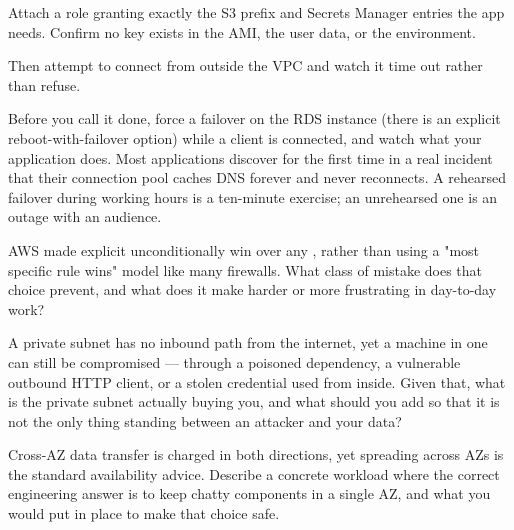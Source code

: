 Attach a role granting exactly the S3 prefix and Secrets Manager entries the app needs. Confirm no key exists in the AMI, the user data, or the environment.

Then attempt to connect from outside the VPC and watch it time out rather than refuse.

\begin{prodtip}
Before you call it done, force a failover on the RDS instance (there is an explicit reboot-with-failover option) while a client is connected, and watch what your application does. Most applications discover for the first time in a real incident that their connection pool caches DNS forever and never reconnects. A rehearsed failover during working hours is a ten-minute exercise; an unrehearsed one is an outage with an audience.
\end{prodtip}


\begin{thinkbox}
AWS made explicit  unconditionally win over any , rather than using a "most specific rule wins" model like many firewalls. What class of mistake does that choice prevent, and what does it make harder or more frustrating in day-to-day work?
\end{thinkbox}

\begin{thinkbox}
A private subnet has no inbound path from the internet, yet a machine in one can still be compromised --- through a poisoned dependency, a vulnerable outbound HTTP client, or a stolen credential used from inside. Given that, what is the private subnet actually buying you, and what should you add so that it is not the only thing standing between an attacker and your data?
\end{thinkbox}

\begin{thinkbox}
Cross-AZ data transfer is charged in both directions, yet spreading across AZs is the standard availability advice. Describe a concrete workload where the correct engineering answer is to keep chatty components in a single AZ, and what you would put in place to make that choice safe.
\end{thinkbox}

